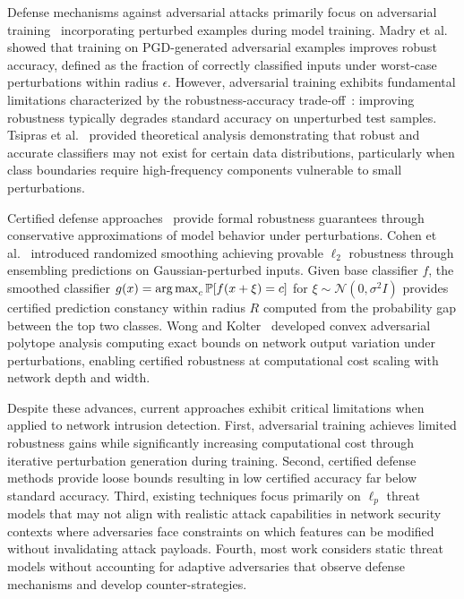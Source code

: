 Defense mechanisms against adversarial attacks primarily focus on adversarial training~\cite{madry2018towards,goodfellow2015explaining} incorporating perturbed examples during model training. Madry et al.~\cite{madry2018towards} showed that training on PGD-generated adversarial examples improves robust accuracy, defined as the fraction of correctly classified inputs under worst-case perturbations within radius $\epsilon$. However, adversarial training exhibits fundamental limitations characterized by the robustness-accuracy trade-off~\cite{tsipras2019robustness}: improving robustness typically degrades standard accuracy on unperturbed test samples. Tsipras et al.~\cite{tsipras2019robustness} provided theoretical analysis demonstrating that robust and accurate classifiers may not exist for certain data distributions, particularly when class boundaries require high-frequency components vulnerable to small perturbations.

Certified defense approaches~\cite{cohen2019certified,wong2018provable} provide formal robustness guarantees through conservative approximations of model behavior under perturbations. Cohen et al.~\cite{cohen2019certified} introduced randomized smoothing achieving provable $\ell_2$ robustness through ensembling predictions on Gaussian-perturbed inputs. Given base classifier $f$, the smoothed classifier $g(x) = \operatorname*{arg\,max}_c \mathbb{P}[f(x + \xi) = c]$ for $\xi \sim \mathcal{N}(0, \sigma^2 I)$ provides certified prediction constancy within radius $R$ computed from the probability gap between the top two classes. Wong and Kolter~\cite{wong2018provable} developed convex adversarial polytope analysis computing exact bounds on network output variation under perturbations, enabling certified robustness at computational cost scaling with network depth and width.

Despite these advances, current approaches exhibit critical limitations when applied to network intrusion detection. First, adversarial training achieves limited robustness gains while significantly increasing computational cost through iterative perturbation generation during training. Second, certified defense methods provide loose bounds resulting in low certified accuracy far below standard accuracy. Third, existing techniques focus primarily on $\ell_p$ threat models that may not align with realistic attack capabilities in network security contexts where adversaries face constraints on which features can be modified without invalidating attack payloads. Fourth, most work considers static threat models without accounting for adaptive adversaries that observe defense mechanisms and develop counter-strategies.

